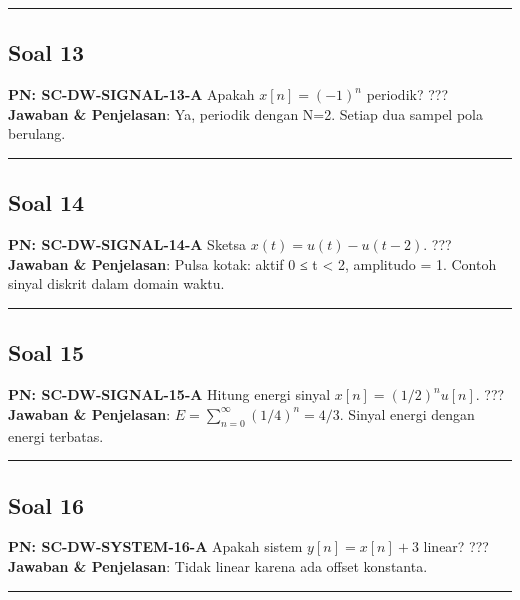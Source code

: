 \documentclass[
  letterpaper,
  DIV=11,
  numbers=noendperiod]{scrreprt}
\begin{document}
\begin{center}\rule{0.5\linewidth}{0.5pt}\end{center}

\subsection{Soal 13}\label{soal-13}

\textbf{PN: SC-DW-SIGNAL-13-A} Apakah \(x[n]=(-1)^n\) periodik? ???
\textbf{Jawaban \& Penjelasan}: Ya, periodik dengan N=2. Setiap dua
sampel pola berulang.

\begin{center}\rule{0.5\linewidth}{0.5pt}\end{center}

\subsection{Soal 14}\label{soal-14}

\textbf{PN: SC-DW-SIGNAL-14-A} Sketsa \(x(t)=u(t)-u(t-2)\). ???
\textbf{Jawaban \& Penjelasan}: Pulsa kotak: aktif 0 ≤ t \textless{} 2,
amplitudo = 1. Contoh sinyal diskrit dalam domain waktu.

\begin{center}\rule{0.5\linewidth}{0.5pt}\end{center}

\subsection{Soal 15}\label{soal-15}

\textbf{PN: SC-DW-SIGNAL-15-A} Hitung energi sinyal
\(x[n]=(1/2)^n u[n]\). ??? \textbf{Jawaban \& Penjelasan}:
\(E=\sum_{n=0}^\infty (1/4)^n=4/3\). Sinyal energi dengan energi
terbatas.

\begin{center}\rule{0.5\linewidth}{0.5pt}\end{center}

\subsection{Soal 16}\label{soal-16}

\textbf{PN: SC-DW-SYSTEM-16-A} Apakah sistem \(y[n]=x[n]+3\) linear? ???
\textbf{Jawaban \& Penjelasan}: Tidak linear karena ada offset
konstanta.

\begin{center}\rule{0.5\linewidth}{0.5pt}\end{center}
\end{document}
